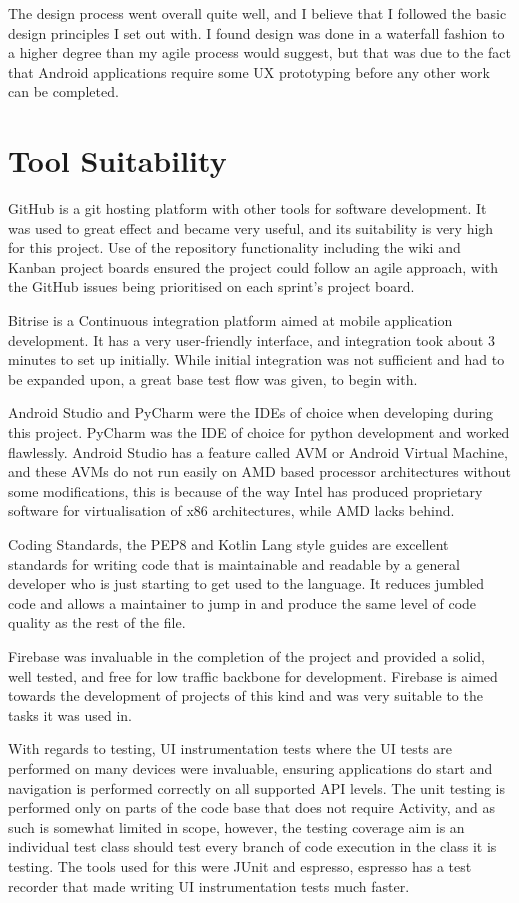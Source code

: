 The design process went overall quite well, and I believe that I followed the basic design principles I set out with. I found design was done in a waterfall fashion to a higher degree than my agile process would suggest, but that was due to the fact that Android applications require some UX prototyping before any other work can be completed.

\section{Tool Suitability}

GitHub is a git hosting platform with other tools for software development. It was used to great effect and became very useful, and its suitability is very high for this project. Use of the repository functionality including the wiki and Kanban project boards ensured the project could follow an agile approach, with the GitHub issues being prioritised on each sprint's project board.

Bitrise is a Continuous integration platform aimed at mobile application development. It has a very user-friendly interface, and integration took about 3 minutes to set up initially. While initial integration was not sufficient and had to be expanded upon, a great base test flow was given, to begin with.

Android Studio and PyCharm were the IDEs of choice when developing during this project. PyCharm was the IDE of choice for python development and worked flawlessly. Android Studio has a feature called AVM or Android Virtual Machine, and these AVMs do not run easily on AMD based processor architectures without some modifications, this is because of the way Intel has produced proprietary software for virtualisation of x86 architectures, while AMD lacks behind.

Coding Standards, the PEP8 and Kotlin Lang style guides are excellent standards for writing code that is maintainable and readable by a general developer who is just starting to get used to the language. It reduces jumbled code and allows a maintainer to jump in and produce the same level of code quality as the rest of the file.

Firebase was invaluable in the completion of the project and provided a solid, well tested, and free for low traffic backbone for development. Firebase is aimed towards the development of projects of this kind and was very suitable to the tasks it was used in.

With regards to testing, UI instrumentation tests where the UI tests are performed on many devices were invaluable, ensuring applications do start and navigation is performed correctly on all supported API levels. The unit testing is performed only on parts of the code base that does not require Activity, and as such is somewhat limited in scope, however, the testing coverage aim is an individual test class should test every branch of code execution in the class it is testing. The tools used for this were JUnit and espresso, espresso has a test recorder that made writing UI instrumentation tests much faster.

